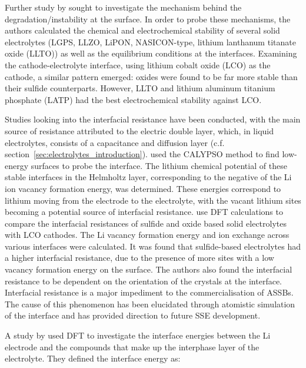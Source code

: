 \documentclass[../main.tex]{subfiles}
\begin{document}
Further study by \citeauthor{Zhu2016} sought to investigate the mechanism behind the degradation/instability at the surface.\cite{Zhu2016} In order to probe these mechanisms, the authors calculated the chemical and electrochemical stability of several solid electrolytes (LGPS, LLZO, LiPON, NASICON-type, lithium lanthanum titanate oxide (LLTO)) as well as the equilibrium conditions at the interfaces. Examining the cathode-electrolyte interface, using lithium cobalt oxide (LCO) as the cathode, a similar pattern emerged: oxides were found to be far more stable than their sulfide counterparts. However, LLTO and lithium aluminum titanium phosphate (LATP) had the best electrochemical stability against LCO.

Studies looking into the interfacial resistance have been conducted,\cite{Tateyama2019, Okuno2020, Sharafi2017, Jiang2019} with the main source of resistance attributed to the electric double layer, which, in liquid electrolytes, consists of a capacitance and diffusion layer (c.f. section~\ref{sec:electrolytes_introduction}).\cite{Tateyama2019} \citeauthor{Tateyama2019} used the CALYPSO method\cite{Wang2012, Gao2019} to find low-energy surfaces to probe the interface. The lithium chemical potential of these stable interfaces in the Helmholtz layer, corresponding to the negative of the Li ion vacancy formation energy, was determined. These energies correspond to lithium moving from the electrode to the electrolyte, with the vacant lithium sites becoming a potential source of interfacial resistance. \citeauthor{Okuno2020} use DFT calculations to compare the interfacial resistances of sulfide and oxide based solid electrolytes with LCO cathodes.\cite{Okuno2020} The Li vacancy formation energy and ion exchange across various interfaces were calculated. It was found that sulfide-based electrolytes had a higher interfacial resistance, due to the presence of more sites with a low vacancy formation energy on the surface. The authors also found the interfacial resistance to be dependent on the orientation of the crystals at the interface. Interfacial resistance is a major impediment to the commercialisation of ASSBs. The cause of this phenomenon has been elucidated through atomistic simulation of the interface and has provided direction to future SSE development. 

A study by \citeauthor{Lepley2015} used DFT to investigate the interface energies between the Li electrode and the compounds that make up the interphase layer of the electrolyte.\cite{Lepley2015} They defined the interface energy as:
\end{document}
